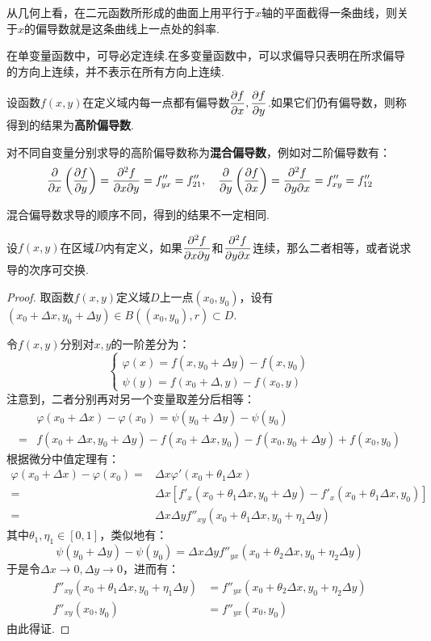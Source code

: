 从几何上看，在二元函数所形成的曲面上用平行于$x$轴的平面截得一条曲线，则关于$x$的偏导数就是这条曲线上一点处的斜率.

\begin{mistake}
    在单变量函数中，可导必定连续.在多变量函数中，可以求偏导只表明在所求偏导的方向上连续，并不表示在所有方向上连续.
\end{mistake}

\begin{definition}
    设函数$f(x,y)$在定义域内每一点都有偏导数$\displaystyle\pdv{f}{x},\pdv{f}{y}$.如果它们仍有偏导数，则称得到的结果为\textbf{高阶偏导数}.

    对不同自变量分别求导的高阶偏导数称为\textbf{混合偏导数}，例如对二阶偏导数有：
    \[\pdv{x}\left(\pdv{f}{y}\right) = \pdv{f}{x}{y} = f''_{yx} = f''_{21},\quad \pdv{y}\left(\pdv{f}{x}\right) = \pdv{f}{y}{x} = f''_{xy} = f''_{12}\]
\end{definition}

混合偏导数求导的顺序不同，得到的结果不一定相同.

\begin{theorem}
    设$f(x,y)$在区域$D$内有定义，如果$\displaystyle\pdv{f}{x}{y}$和$\displaystyle\pdv{f}{y}{x}$连续，那么二者相等，或者说求导的次序可交换.
\end{theorem}

\begin{proof}
    取函数$f(x,y)$定义域$D$上一点$(x_0,y_0)$，设有$(x_0+\Delta x, y_0+\Delta y) \in B((x_0,y_0),r) \subset D$.

    令$f(x,y)$分别对$x,y$的一阶差分为：
    \[\begin{cases}
        \varphi(x) = f(x,y_0+\Delta y) - f(x,y_0)\\
        \psi(y) = f(x_0+\Delta,y) - f(x_0,y)
    \end{cases}\]
    注意到，二者分别再对另一个变量取差分后相等：
    \begin{align*}
        &\varphi(x_0+\Delta x) - \varphi(x_0) = \psi(y_0+\Delta y) - \psi(y_0)\\
        =& f(x_0+\Delta x, y_0+\Delta y) - f(x_0+\Delta x,y_0) - f(x_0,y_0+\Delta y) + f(x_0,y_0)
    \end{align*}
    根据微分中值定理有：
    \begin{align*}
        \varphi(x_0+\Delta x) - \varphi(x_0)
        =& \Delta x\varphi'(x_0+\theta_1\Delta x) \\
        =& \Delta x[f'_x(x_0+\theta_1\Delta x,y_0+\Delta y) - f'_x(x_0+\theta_1\Delta x,y_0)] \\
        =& \Delta x \Delta y f''_{xy}(x_0+\theta_1 \Delta x, y_0+\eta_1 \Delta y)
    \end{align*}
    其中$\theta_1,\eta_1 \in [0,1]$，类似地有：
    \[\psi(y_0+\Delta y) - \psi(y_0) = \Delta x \Delta y f''_{yx}(x_0 + \theta_2\Delta x,y_0+\eta_2\Delta y)\]
    于是令$\Delta x \to 0,\Delta y \to 0$，进而有：
    \begin{align*}
        f''_{xy}(x_0+\theta_1\Delta x,y_0+\eta_1\Delta y) &= f''_{yx}(x_0+\theta_2\Delta x, y_0+\eta_2\Delta y) \\
        f''_{xy}(x_0,y_0) &= f''_{yx}(x_0,y_0)
    \end{align*}
    由此得证.
\end{proof}


